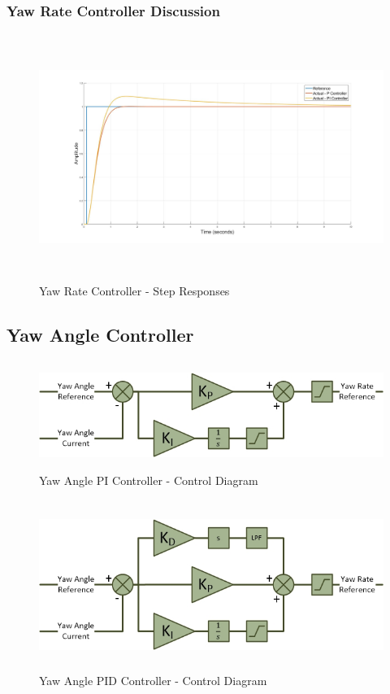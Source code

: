 		\subsubsection{Yaw Rate Controller Discussion}
		\begin{figure}[H]
			\centering
			\includegraphics[height = 8cm]{../Design/Matlab/Controllers/yaw_rate_step.jpg}
			\caption{Yaw Rate Controller -  Step Responses}
			\label{IM_YawRateStep}
		\end{figure}
		
		
		\subsection{Yaw Angle Controller}	
		
		\begin{figure}[H]
			\centering
			\includegraphics[height = 3.5cm]{../References/Diagrams/YawAngleControllerPI.jpg}
			\caption{Yaw Angle PI Controller -  Control Diagram}
			\label{IM_YawAngleController}
		\end{figure}

		\begin{figure}[H]
			\centering
			\includegraphics[height = 5.5cm]{../References/Diagrams/YawAngleControllerPID.jpg}
			\caption{Yaw Angle PID Controller -  Control Diagram}
			\label{IM_YawAngleControllerPID}
		\end{figure}
				

